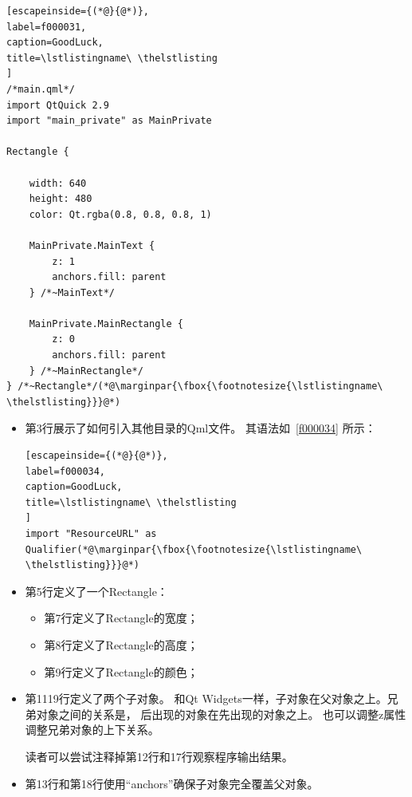 \FloatBarrier
\begin{lstlisting}[escapeinside={(*@}{@*)},
label=f000031,
caption=GoodLuck,
title=\lstlistingname\ \thelstlisting
]
/*main.qml*/
import QtQuick 2.9
import "main_private" as MainPrivate

Rectangle {

    width: 640
    height: 480
    color: Qt.rgba(0.8, 0.8, 0.8, 1)

    MainPrivate.MainText {
        z: 1
        anchors.fill: parent
    } /*~MainText*/

    MainPrivate.MainRectangle {
        z: 0
        anchors.fill: parent
    } /*~MainRectangle*/
} /*~Rectangle*/(*@\marginpar{\fbox{\footnotesize{\lstlistingname\ \thelstlisting}}}@*)\end{lstlisting}          %

\begin{itemize}

\item 第3行展示了如何引入其他目录的Qml文件。
其语法如\lstlistingname\ \ref{f000034}
所示：

\FloatBarrier
\begin{lstlisting}[escapeinside={(*@}{@*)},
label=f000034,
caption=GoodLuck,
title=\lstlistingname\ \thelstlisting
]
import "ResourceURL" as Qualifier(*@\marginpar{\fbox{\footnotesize{\lstlistingname\ \thelstlisting}}}@*)\end{lstlisting}          %

\item 第5行定义了一个Rectangle：


\begin{itemize}
\item 第7行定义了Rectangle的宽度；
\item 第8行定义了Rectangle的高度；
\item 第9行定义了Rectangle的颜色；
\end{itemize}

\item 第11\raisebox{0.16ex}{\sourcefonttwo\~{}}19行定义了两个子对象。
和Qt Widgets一样，子对象在父对象之上。兄弟对象之间的关系是，
后出现的对象在先出现的对象之上。
也可以调整z属性调整兄弟对象的上下关系。

读者可以尝试注释掉第12行和17行观察程序输出结果。


\item 第13行和第18行使用“anchors”确保子对象完全覆盖父对象。

\end{itemize}

